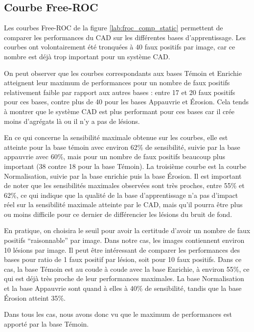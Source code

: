 \subsection{Courbe Free-ROC}

Les courbes Free-ROC de la figure \ref{lab:froc_comp_static} permettent de comparer les performances du CAD sur les différentes bases d'apprentissage. Les courbes ont volontairement été tronquées à 40 faux positifs par image, car ce nombre est déjà trop important pour un système CAD.

On peut observer que les courbes correspondants aux bases Témoin et Enrichie atteignent leur maximum de performances pour un nombre de faux positifs relativement faible par rapport aux autres bases : entre 17 et 20 faux positifs pour ces bases, contre plus de 40 pour les bases Appauvrie et \'Erosion. Cela tends à montrer que le système CAD est plus performant pour ces bases car il crée moins d'agrégats là ou il n'y a pas de lésions.

En ce qui concerne la sensibilité maximale obtenue sur les courbes, elle est atteinte pour la base témoin avec environ 62\% de sensibilité, suivie par la base appauvrie avec 60\%, mais pour un nombre de faux positifs beaucoup plus important (38 contre 18 pour la base Témoin). La troisième courbe est la courbe Normalisation, suivie par la base enrichie puis la base \'Erosion. Il est important de noter que les sensibilités maximales observées sont très proches, entre 55\% et 62\%, ce qui indique que la qualité de la base d'apprentissage n'a pas d'impact réel sur la sensibilité maximale atteinte par le CAD, mais qu'il pourra être plus ou moins difficile pour ce dernier de différencier les lésions du bruit de fond. 

En pratique, on choisira le seuil pour avoir la certitude d'avoir un nombre de faux positifs ``raisonnable'' par image. Dans notre cas, les images contiennent environ 10 lésions par image. Il peut être intéressant de comparer les performances des bases pour ratio de 1 faux positif par lésion, soit pour 10 faux positifs. Dans ce cas, la base Témoin est au coude à coude avec la base Enrichie, à environ 55\%, ce qui est déjà très proche de leur performances maximales. La base Normalisation et la base Appauvrie sont quand à elles à 40\% de sensibilité, tandis que la base Érosion atteint 35\%.

Dans tous les cas, nous avons donc vu que le maximum de performances est apporté par la base Témoin.

